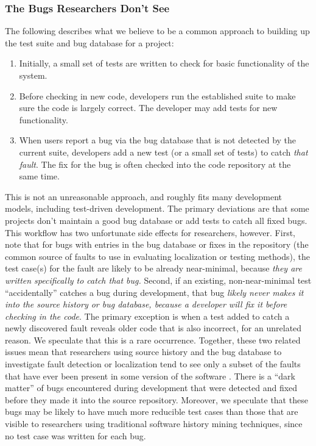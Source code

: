 \subsubsection{The Bugs Researchers Don't See}

The following describes what we believe to be a common approach to
building up the test suite and bug database for a project:

\begin{enumerate}
\item Initially, a small set of tests are written to check for basic functionality of the system.
\item Before checking in new code, developers run the established
suite to make sure the code is largely correct.  The developer may add
tests for new functionality.
\item When users report a bug via the bug database that is not
detected by the current suite, developers add a new test (or a small
set of tests) to catch \emph{that fault}.  The fix for the bug is
often checked into the code repository at the same time.
\end{enumerate}


This is not an unreasonable approach, and roughly fits many
development models, including test-driven development.  The primary
deviations are that some projects don't maintain a good bug database
or add tests to catch all fixed bugs.  This workflow has two
unfortunate side effects for researchers, however.  First, note that
for bugs with entries in the bug database or fixes in the repository
(the common source of faults to use in evaluating localization or
testing methods), the test case(s) for the fault are likely to be
already near-minimal, because \emph{they are written specifically to
catch that bug.}  Second, if an existing, non-near-minimal test
``accidentally'' catches a bug during development, that bug
\emph{likely never makes it into the source history or bug database,
because a developer will fix it before checking in the code}.  The
primary exception is when a test added to catch a newly discovered
fault reveals older code that is also incorrect, for an unrelated
reason.  We speculate that this is a rare occurrence.  Together, these
two related issues mean that researchers using source history and the
bug database to investigate fault detection or localization tend to
see only a subset of the faults that have ever been present in some
version of the software \cite{Dangerous}.  There is a ``dark matter''
of bugs encountered during development that were detected and fixed
before they made it into the source repository.  Moreover, we
speculate that these bugs may be likely to have much more reducible
test cases than those that are visible to researchers using
traditional software history mining techniques, since no test case was
written for each bug.

